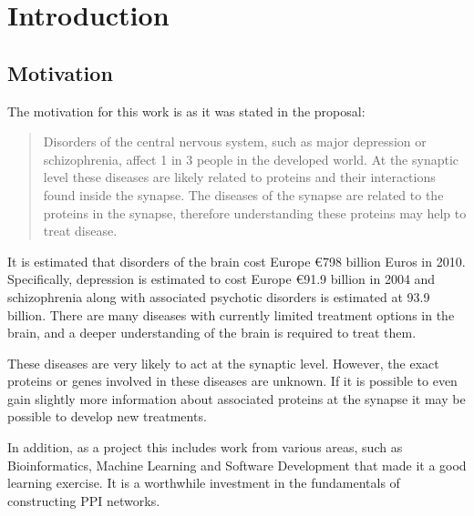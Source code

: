 \chapter{Introduction}
\label{introduction}

\lipsum[1]

\section{Motivation}

The motivation for this work is as it was stated in the proposal\cite{proposal}:

\begin{quote}
    Disorders of the central nervous system, such as major depression or schizophrenia, affect 1 in 3 people in the developed world.
    At the synaptic level these diseases are likely related to proteins and their interactions found inside the synapse\cites{chua_architecture_2010,synsys}.
    The diseases of the synapse are related to the proteins in the synapse\cite{chua_architecture_2010}, therefore understanding these proteins may help to treat disease\cite{li_interaction_2010}.
\end{quote}

It is estimated that disorders of the brain cost Europe €798 billion Euros in 2010\cite{olesen_economic_2012}.
Specifically, depression is estimated to cost Europe €91.9 billion in 2004 and schizophrenia along with associated psychotic disorders is estimated at 93.9 billion.
There are many diseases with currently limited treatment options in the brain, and a deeper understanding of the brain is required to treat them.

These diseases are very likely to act at the synaptic level\cites{chua_architecture_2010,synsys}.
However, the exact proteins or genes involved in these diseases are unknown.
If it is possible to even gain slightly more information about associated proteins at the synapse it may be possible to develop new treatments\cite{li_interaction_2010}.

In addition, as a project this includes work from various areas, such as Bioinformatics, Machine Learning and Software Development that made it a good learning exercise.
It is a worthwhile investment in the fundamentals of constructing PPI networks.

